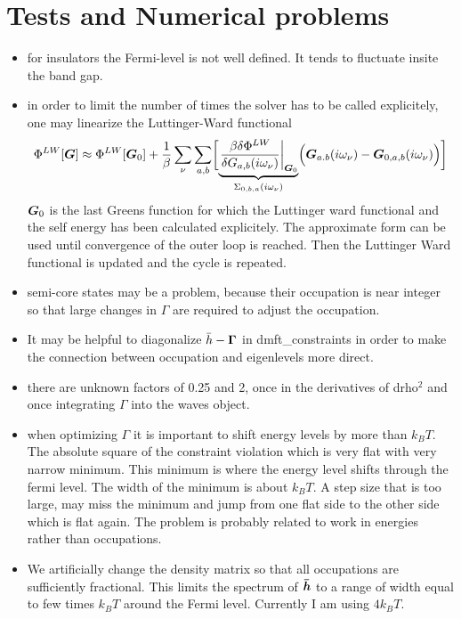 \documentclass[11pt,a4paper]{report}
\begin{document}
\chapter{Tests and Numerical problems}
\begin{itemize}
%
\item for insulators the Fermi-level is not well defined. It tends to
  fluctuate insite the band gap.
%
\item in order to limit the number of times the solver has to be
  called explicitely, one may linearize the Luttinger-Ward functional
\begin{eqnarray}
\Phi^{LW}[\bm{G}]\approx \Phi^{LW}[\bm{G}_0]
+\frac{1}{\beta}\sum_\nu\sum_{a,b}\biggl[
\underbrace{
\left.\frac{\beta\delta\Phi^{LW}}{\delta{G}_{a,b}(i\omega_\nu)}\right|_{\bm{G}_0}
}_{\Sigma_{0,b,a}(i\omega_\nu)}
\Bigl(\bm{G}_{a.b}(i\omega_\nu)-\bm{G}_{0,a,b}(i\omega_\nu)\Bigr)
\biggr]
\end{eqnarray}
$\bm{G}_0$ is the last Greens function for which the Luttinger ward
functional and the self energy has been calculated explicitely. The
approximate form can be used until convergence of the outer loop is
reached. Then the Luttinger Ward functional is updated and the cycle
is repeated.
%
\item semi-core states may be a problem, because their occupation is
  near integer so that large changes in $\Gamma$ are required to
  adjust the occupation.
%
\item It may be helpful to diagonalize $\bar{h}-\bm{\Gamma}$ in
  dmft\_constraints in order to make the connection between occupation
  and eigenlevels more direct.
%
\item there are unknown factors of 0.25 and 2, once in the derivatives
  of drho$^2$ and once integrating $\Gamma$ into the waves object.
%
\item when optimizing $\Gamma$ it is important to shift energy levels
  by more than $k_{B}T$. The absolute square of the constraint violation
  which is very flat with very narrow minimum. This minimum is where
  the energy level shifts through the fermi level. The width of the
  minimum is about $k_BT$. A step size that is too large, may miss the
  minimum and jump from one flat side to the other side which is flat
  again. The problem is probably related to work in energies rather
  than occupations.
%
\item We artificially change the density matrix so that all
  occupations are sufficiently fractional. This limits the spectrum of
  $\bm{\bar{h}}$ to a range of width equal to few times $k_BT$ around
  the Fermi level. Currently I am using $4k_BT$.
\end{itemize}
\end{document}
